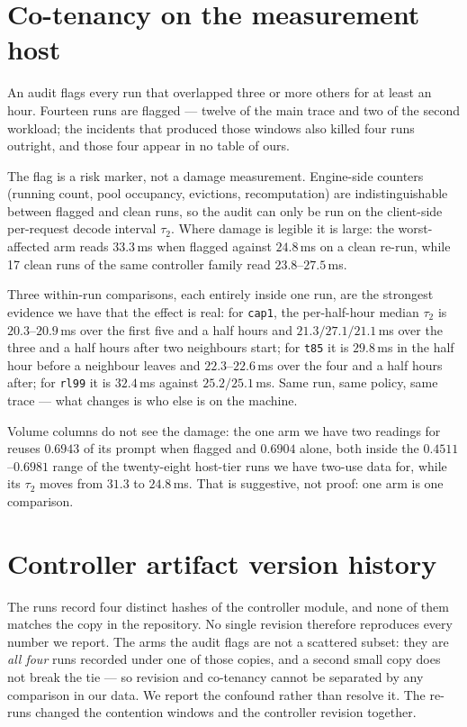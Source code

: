 \documentclass[10pt]{article}
\begin{document}
\section{Co-tenancy on the measurement host}

An audit flags every run that overlapped three or more others for at least an
hour. Fourteen runs are flagged --- twelve of the main trace and two of the
second workload; the incidents that produced those windows also killed four runs
outright, and those four appear in no table of ours.

The flag is a risk marker, not a damage measurement. Engine-side counters
(running count, pool occupancy, evictions, recomputation) are indistinguishable
between flagged and clean runs, so the audit can only be run on the client-side
per-request decode interval $\tau_2$. Where damage is legible it is large: the
worst-affected arm reads $33.3$\,ms when flagged against $24.8$\,ms on a clean
re-run, while 17 clean runs of the same controller family read
$23.8$--$27.5$\,ms.

Three within-run comparisons, each entirely inside one run, are the strongest
evidence we have that the effect is real: for \texttt{cap1}, the per-half-hour
median $\tau_2$ is $20.3$--$20.9$\,ms over the first five and a half hours and
$21.3/27.1/21.1$\,ms over the three and a half hours after two neighbours
start; for \texttt{t85} it is $29.8$\,ms in the half hour before a neighbour
leaves and $22.3$--$22.6$\,ms over the four and a half hours after; for
\texttt{rl99} it is $32.4$\,ms against $25.2/25.1$\,ms. Same run, same policy,
same trace --- what changes is who else is on the machine.

Volume columns do not see the damage: the one arm we have two readings for reuses
$0.6943$ of its prompt when flagged and $0.6904$ alone, both inside the
$0.4511$--$0.6981$ range of the twenty-eight host-tier runs we have two-use data
for, while its $\tau_2$ moves from $31.3$ to $24.8$\,ms. That is suggestive, not
proof: one arm is one comparison.


\section{Controller artifact version history}

The runs record four distinct hashes of the controller module, and none of them
matches the copy in the repository. No single revision therefore reproduces every
number we report. The arms the audit flags are not a scattered subset: they are
\emph{all four} runs recorded under one of those copies, and a second small copy
does not break the tie --- so revision and co-tenancy cannot be separated by any
comparison in our data. We report the confound rather than resolve it. The
re-runs changed the contention windows and the controller revision together.
\end{document}
